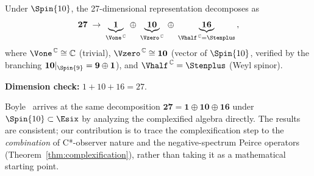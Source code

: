 Under $\Spin{10}$, the 27-dimensional representation decomposes as
\begin{equation}\label{eq:27-decomp}
  \mathbf{27}
  \;\to\;
  \underbrace{\mathbf{1}}_{\Vone^{\,\mathbb{C}}}
  \;\oplus\;
  \underbrace{\mathbf{10}}_{\Vzero^{\,\mathbb{C}}}
  \;\oplus\;
  \underbrace{\mathbf{16}}_{\Vhalf^{\,\mathbb{C}} = \Stenplus}\,,
\end{equation}
where $\Vone^{\,\mathbb{C}} \cong \mathbb{C}$ (trivial),
$\Vzero^{\,\mathbb{C}} \cong \mathbf{10}$ (vector of $\Spin{10}$,
verified by the branching $\mathbf{10}|_{\Spin{9}} = \mathbf{9}\oplus\mathbf{1}$),
and $\Vhalf^{\,\mathbb{C}} = \Stenplus$ (Weyl spinor).

\noindent\textbf{Dimension check:}
$1 + 10 + 16 = 27$.\ \checkmark

\begin{remark}
Boyle~\cite{Boyle2020} arrives at the same decomposition
$\mathbf{27} = \mathbf{1}\oplus\mathbf{10}\oplus\mathbf{16}$ under
$\Spin{10}\subset\Esix$ by analyzing the complexified algebra
directly.  The results are consistent; our contribution is to trace the complexification step to the
\emph{combination} of C*-observer nature and the negative-spectrum
Peirce operators (Theorem~\ref{thm:complexification}), rather than
taking it as a mathematical starting point.
\end{remark}

